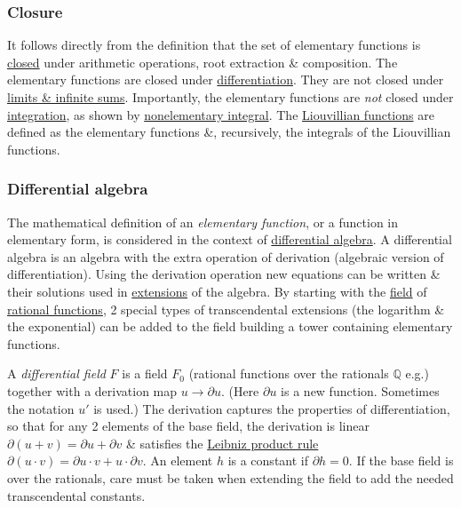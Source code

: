 \documentclass{article}
\begin{document}
\subsubsection{Closure}
It follows directly from the definition that the set of elementary functions is \href{https://en.wikipedia.org/wiki/Closure_(mathematics)}{closed} under arithmetic operations, root extraction \& composition. The elementary functions are closed under \href{https://en.wikipedia.org/wiki/Derivative}{differentiation}. They are not closed under \href{https://en.wikipedia.org/wiki/Series_(mathematics)}{limits \& infinite sums}. Importantly, the elementary functions are {\it not} closed under \href{https://en.wikipedia.org/wiki/Antiderivative}{integration}, as shown by \href{https://en.wikipedia.org/wiki/Liouville%27s_theorem_(differential_algebra)}{nonelementary integral}. The \href{https://en.wikipedia.org/wiki/Liouvillian_function}{Liouvillian functions} are defined as the elementary functions \&, recursively, the integrals of the Liouvillian functions.

\subsubsection{Differential algebra}
The mathematical definition of an {\it elementary function}, or a function in elementary form, is considered in the context of \href{https://en.wikipedia.org/wiki/Differential_algebra}{differential algebra}. A differential algebra is an algebra with the extra operation of derivation (algebraic version of differentiation). Using the derivation operation new equations can be written \& their solutions used in \href{https://en.wikipedia.org/wiki/Field_extension}{extensions} of the algebra. By starting with the \href{https://en.wikipedia.org/wiki/Field_(mathematics)}{field} of \href{https://en.wikipedia.org/wiki/Rational_function}{rational functions}, 2 special types of transcendental extensions (the logarithm \& the exponential) can be added to the field building a tower containing elementary functions.

A {\it differential field} $F$ is a field $F_0$ (rational functions over the rationals $\mathbb{Q}$ e.g.) together with a derivation map $u\to\partial u$. (Here $\partial u$ is a new function. Sometimes the notation $u'$ is used.) The derivation captures the properties of differentiation, so that for any 2 elements of the base field, the derivation is linear $\partial(u + v) = \partial u + \partial v$ \& satisfies the \href{https://en.wikipedia.org/wiki/Product_rule}{Leibniz product rule} $\partial(u\cdot v) = \partial u\cdot v + u\cdot\partial v$. An element $h$ is a constant if $\partial h = 0$. If the base field is over the rationals, care must be taken when extending the field to add the needed transcendental constants.
\end{document}
